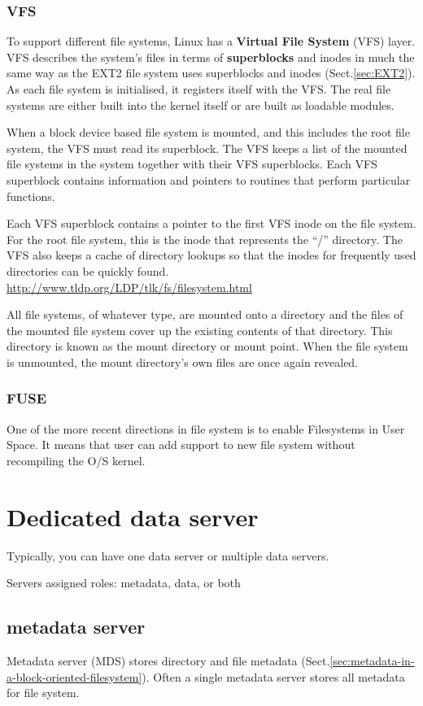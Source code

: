 \subsection{VFS}

To support different file systems, Linux has a {\bf Virtual File System} (VFS)
layer. VFS describes the system's files in terms of {\bf superblocks} and inodes
in much the same way as the EXT2 file system uses superblocks and inodes
(Sect.\ref{sec:EXT2}).
As each file system is initialised, it registers itself with the VFS. The real
file systems are either built into the kernel itself or are built as loadable
modules. 

When a block device based file system is mounted, and this includes the root
file system, the VFS must read its superblock. The VFS keeps a list of the
mounted file systems in the system together with their VFS superblocks. Each VFS
superblock contains information and pointers to routines that perform particular
functions. 

Each VFS superblock contains a pointer to the first VFS inode on the file
system. For the root file system, this is the inode that represents the ``/''
directory. The VFS also keeps a cache of directory lookups so that the inodes
for frequently used directories can be quickly found.
\url{http://www.tldp.org/LDP/tlk/fs/filesystem.html}

All file systems, of whatever type, are mounted onto a directory and the files
of the mounted file system cover up the existing contents of that directory.
This directory is known as the mount directory or mount point. When the file
system is unmounted, the mount directory's own files are once again revealed.  


\subsection{FUSE}

One of the more recent directions in file system is to enable Filesystems
in User Space. It means that user can add support to new file system without
recompiling the O/S kernel. 

\chapter{Dedicated data server}

Typically, you can have one data server or multiple data servers.


Servers assigned roles: metadata, data, or both


\section{metadata server}
\label{sec:metadata-server}

Metadata server (MDS) stores directory and file metadata
(Sect.\ref{sec:metadata-in-a-block-oriented-filesystem}).
Often a single metadata server stores all metadata for file system.

